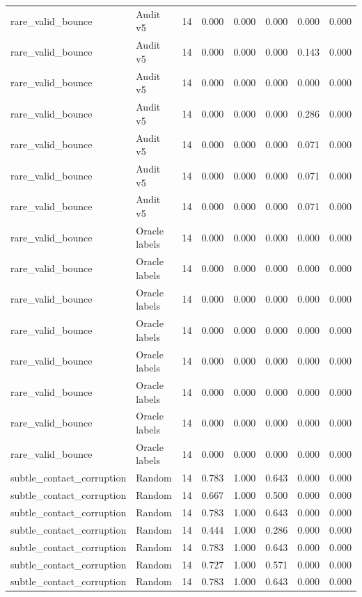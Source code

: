 {\begin{longtable}{llrrrrrr}
rare\_valid\_bounce & Audit v5 & 14 & 0.000 & 0.000 & 0.000 & 0.000 & 0.000 \\
rare\_valid\_bounce & Audit v5 & 14 & 0.000 & 0.000 & 0.000 & 0.143 & 0.000 \\
rare\_valid\_bounce & Audit v5 & 14 & 0.000 & 0.000 & 0.000 & 0.000 & 0.000 \\
rare\_valid\_bounce & Audit v5 & 14 & 0.000 & 0.000 & 0.000 & 0.286 & 0.000 \\
rare\_valid\_bounce & Audit v5 & 14 & 0.000 & 0.000 & 0.000 & 0.071 & 0.000 \\
rare\_valid\_bounce & Audit v5 & 14 & 0.000 & 0.000 & 0.000 & 0.071 & 0.000 \\
rare\_valid\_bounce & Audit v5 & 14 & 0.000 & 0.000 & 0.000 & 0.071 & 0.000 \\
rare\_valid\_bounce & Oracle labels & 14 & 0.000 & 0.000 & 0.000 & 0.000 & 0.000 \\
rare\_valid\_bounce & Oracle labels & 14 & 0.000 & 0.000 & 0.000 & 0.000 & 0.000 \\
rare\_valid\_bounce & Oracle labels & 14 & 0.000 & 0.000 & 0.000 & 0.000 & 0.000 \\
rare\_valid\_bounce & Oracle labels & 14 & 0.000 & 0.000 & 0.000 & 0.000 & 0.000 \\
rare\_valid\_bounce & Oracle labels & 14 & 0.000 & 0.000 & 0.000 & 0.000 & 0.000 \\
rare\_valid\_bounce & Oracle labels & 14 & 0.000 & 0.000 & 0.000 & 0.000 & 0.000 \\
rare\_valid\_bounce & Oracle labels & 14 & 0.000 & 0.000 & 0.000 & 0.000 & 0.000 \\
rare\_valid\_bounce & Oracle labels & 14 & 0.000 & 0.000 & 0.000 & 0.000 & 0.000 \\
subtle\_contact\_corruption & Random & 14 & 0.783 & 1.000 & 0.643 & 0.000 & 0.000 \\
subtle\_contact\_corruption & Random & 14 & 0.667 & 1.000 & 0.500 & 0.000 & 0.000 \\
subtle\_contact\_corruption & Random & 14 & 0.783 & 1.000 & 0.643 & 0.000 & 0.000 \\
subtle\_contact\_corruption & Random & 14 & 0.444 & 1.000 & 0.286 & 0.000 & 0.000 \\
subtle\_contact\_corruption & Random & 14 & 0.783 & 1.000 & 0.643 & 0.000 & 0.000 \\
subtle\_contact\_corruption & Random & 14 & 0.727 & 1.000 & 0.571 & 0.000 & 0.000 \\
subtle\_contact\_corruption & Random & 14 & 0.783 & 1.000 & 0.643 & 0.000 & 0.000 \\

\end{longtable}}
